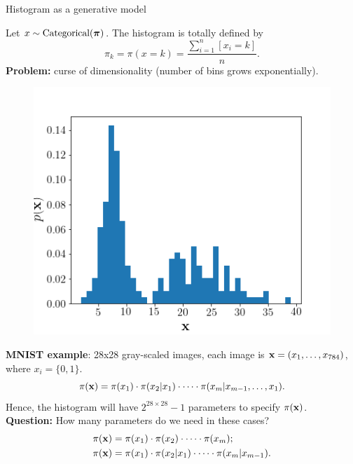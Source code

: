 \begin{frame}{Histogram as a generative model}
	
	\begin{minipage}[t]{0.6\columnwidth}
	    Let $x \sim \text{Categorical}(\boldsymbol{\pi})$. The histogram is totally defined by
		\[
		    \pi_k = \pi(x = k) = \frac{\sum_{i=1}^n [x_i = k]}{n}.
		\]
		\textbf{Problem:} curse of dimensionality (number of bins grows exponentially). \\
		\end{minipage}%
		\begin{minipage}[t]{0.4\columnwidth}
	    \begin{figure}[h]
	        \centering
	        \includegraphics[width=\linewidth]{figs/histogram.png}
	    \end{figure}
	\end{minipage}
	\textbf{MNIST example}: 28x28 gray-scaled images, each image is $\mathbf{x} = (x_1, \dots, x_{784})$, where $x_i = \{0, 1\}$. 
	\[
	    \pi(\mathbf{x}) = \pi(x_1) \cdot \pi(x_2 | x_1) \cdot \dots \cdot \pi(x_m | x_{m-1}, \dots, x_1).
	\]
	Hence, the histogram will have $2^{28 \times 28} - 1$ parameters to specify $\pi(\mathbf{x})$. \\
	\textbf{Question:} How many parameters do we need in these cases?
	\begin{align*}
	    \pi(\mathbf{x}) &= \pi(x_1) \cdot \pi(x_2)\cdot \dots \cdot \pi(x_m); \\
	    \pi(\mathbf{x}) &= \pi(x_1) \cdot \pi(x_2 | x_1) \cdot \dots \cdot \pi(x_m | x_{m-1}).
	\end{align*}
\end{frame}
